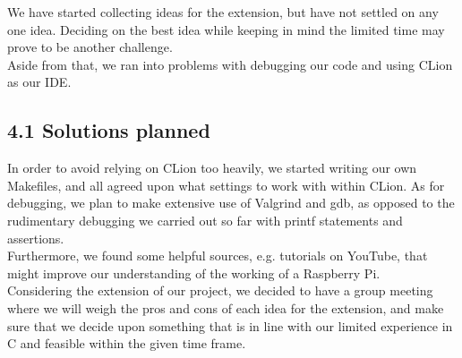 \documentclass[a4paper, twoside]{report}
\begin{document}
We have started collecting ideas for the extension, but have not settled on any one idea. Deciding on the best idea while keeping in mind the limited time may prove to be another challenge. \\
Aside from that, we ran into problems with debugging our code and using CLion as our IDE.
\subsection*{4.1 Solutions planned}

In order to avoid relying on CLion too heavily, we started writing our own Makefiles, and all agreed upon what settings to work with within CLion. As for debugging, we plan to make extensive use of Valgrind and gdb, as opposed to the rudimentary debugging we carried out so far with printf statements and assertions. \\
Furthermore, we found some helpful sources, e.g. tutorials on YouTube, that might improve our understanding of the working of a Raspberry Pi. \\
Considering the extension of our project, we decided to have a group meeting where we will weigh the pros and cons of each idea for the extension, and make sure that we decide upon something that is in line with our limited experience in C and feasible within the given time frame.
\end{document}
